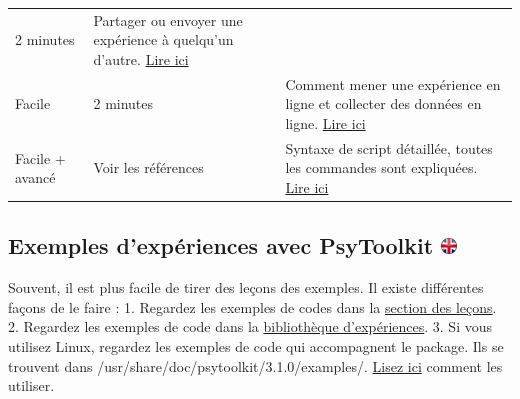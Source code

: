 \documentclass[
]{book}
\begin{document}
\begin{longtable}[]{@{}lll@{}}
\begin{minipage}[t]{0.13\columnwidth}
2 minutes\strut
\end{minipage} & \begin{minipage}[t]{0.67\columnwidth}\raggedright
Partager ou envoyer une expérience à quelqu'un d'autre.
\protect\hyperlink{s4-4}{Lire ici}\strut
\end{minipage}\tabularnewline
\begin{minipage}[t]{0.11\columnwidth}\raggedright
Facile\strut
\end{minipage} & \begin{minipage}[t]{0.13\columnwidth}\raggedright
2 minutes\strut
\end{minipage} & \begin{minipage}[t]{0.67\columnwidth}\raggedright
Comment mener une expérience en ligne et collecter des données en ligne.
\protect\hyperlink{s4-5}{Lire ici}\strut
\end{minipage}\tabularnewline
\begin{minipage}[t]{0.11\columnwidth}\raggedright
Facile + avancé\strut
\end{minipage} & \begin{minipage}[t]{0.13\columnwidth}\raggedright
Voir les références\strut
\end{minipage} & \begin{minipage}[t]{0.67\columnwidth}\raggedright
Syntaxe de script détaillée, toutes les commandes sont expliquées.
\protect\hyperlink{s5}{Lire ici}\strut
\end{minipage}\tabularnewline
\bottomrule
\end{longtable}

\hypertarget{exemples-dexpuxe9riences-avec-psytoolkit}{%
\subsection[Exemples d'expériences avec PsyToolkit
]{\texorpdfstring{Exemples d'expériences avec PsyToolkit
\href{https://www.psytoolkit.org/doc3.1.0/\#_experiments_and_surveys}{\protect\includegraphics{img/ukflag.png}}}{Exemples d'expériences avec PsyToolkit }}\label{exemples-dexpuxe9riences-avec-psytoolkit}}

Souvent, il est plus facile de tirer des leçons des exemples. Il existe
différentes façons de le faire : 1. Regardez les exemples de codes dans
la \href{https://www.psytoolkit.org/lessons/\#lessons4}{section des
leçons}. 2. Regardez les exemples de code dans la
\href{https://www.psytoolkit.org/experiment-library}{bibliothèque
d'expériences}. 3. Si vous utilisez Linux, regardez les exemples de code
qui accompagnent le package. Ils se trouvent dans
/usr/share/doc/psytoolkit/3.1.0/examples/.
\href{https://www.psytoolkit.org/linux.html\#local_examples}{Lisez ici}
comment les utiliser.
\end{document}
